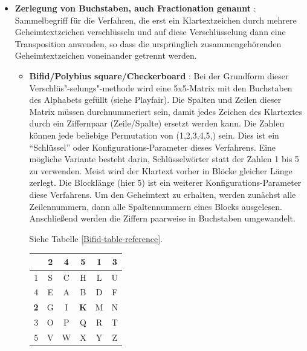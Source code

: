 \begin{refsegment}
\begin{itemize}
\item \textbf{Zerlegung von Buchstaben, auch Fractionation genannt}
   \cite{Savard1999}: Sammelbegriff für die Verfahren, die erst ein
   Klartextzeichen durch mehrere Geheimtextzeichen verschlüsseln und auf
   diese Verschlüsselung dann eine Transposition anwenden, so dass die
   ursprünglich zusammengehörenden Geheimtextzeichen voneinander getrennt
   werden.

   \begin{itemize}
      \item \textbf{Bifid/Polybius square/Checkerboard} \cite{Goebel2014}:
         Bei der Grundform dieser Verschlüs"-selungs"-methode wird eine
         5x5-Matrix
         mit den Buchstaben des Alphabets gefüllt (siehe Playfair). Die
         Spalten und Zeilen dieser Matrix müssen durchnummeriert sein, damit
         jedes Zeichen des Klartextes durch ein Ziffernpaar (Zeile/Spalte)
         ersetzt werden kann. Die Zahlen können jede beliebige Permutation
         von (1,2,3,4,5,) sein. Dies ist ein "`Schlüssel"' oder
         Konfigurations-Parameter dieses Verfahrens. Eine mögliche Variante
         besteht darin, Schlüsselwörter statt der Zahlen 1 bis 5
         zu verwenden.
	 Meist wird der Klartext vorher in Blöcke gleicher Länge
         zerlegt. Die Blocklänge (hier 5) ist ein weiterer
         Konfigurations-Parameter diese Verfahrens. Um den Geheimtext zu
         erhalten, werden zunächst alle Zeilennummern, dann alle
         Spaltennummern eines Blocks ausgelesen.
         Anschließend werden die Ziffern paarweise in Buchstaben umgewandelt.


         Siehe Tabelle \ref{Bifid-table-reference}.

         \begin{table}[ht]

         \begin{center}
         \begin{tabular}{|c|ccccc|}
         \hline
            & 2 & 4 & \textbf{5} & 1 & 3\\
         \hline
          1 & S & C & H & L & U\\
          4 & E & A & B & D & F\\
	  \textbf{2} & G & I & \textbf{K} & M & N\\
          3 & O & P & Q & R & T\\
          5 & V & W & X & Y & Z\\
         \hline
         \end{tabular}
         \end{center}


\end{table}
\end{itemize}
\end{itemize}
\end{refsegment}

